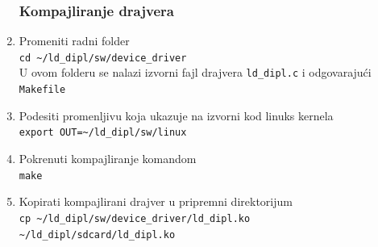 \begin{enumerate}
\subsubsection{Kompajliranje drajvera}
\item Promeniti radni folder\\
\texttt{cd \textasciitilde/ld\_dipl/sw/device\_driver}\\
U ovom folderu se nalazi izvorni fajl drajvera \texttt{ld\_dipl.c} i odgovarajući \texttt{Makefile}
\item Podesiti promenljivu koja ukazuje na izvorni kod linuks kernela\\
\texttt{export OUT=\textasciitilde/ld\_dipl/sw/linux}
\item Pokrenuti kompajliranje komandom\\
\texttt{make}
\item Kopirati kompajlirani drajver u pripremni direktorijum\\
\texttt{cp \textasciitilde/ld\_dipl/sw/device\_driver/ld\_dipl.ko \textasciitilde/ld\_dipl/sdcard/ld\_dipl.ko }


\end{enumerate}
